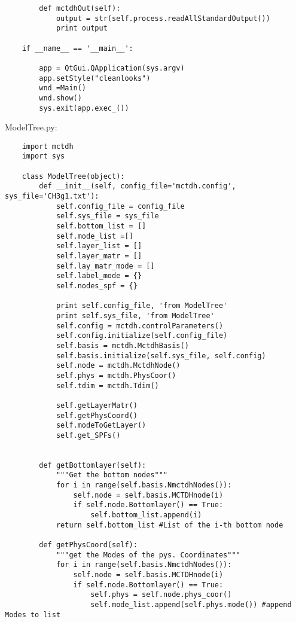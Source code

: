 \begin{verbatim}
        def mctdhOut(self):
            output = str(self.process.readAllStandardOutput())
            print output
    
    if __name__ == '__main__':
    
        app = QtGui.QApplication(sys.argv)
        app.setStyle("cleanlooks")
        wnd =Main()
        wnd.show()
        sys.exit(app.exec_())
\end{verbatim}

ModelTree.py:

\begin{verbatim}
    import mctdh
    import sys
    
    class ModelTree(object):
        def __init__(self, config_file='mctdh.config', sys_file='CH3g1.txt'):
            self.config_file = config_file
            self.sys_file = sys_file
            self.bottom_list = []
            self.mode_list =[]
            self.layer_list = []
            self.layer_matr = []
            self.lay_matr_mode = []
            self.label_mode = {}
            self.nodes_spf = {}
    
            print self.config_file, 'from ModelTree'
            print self.sys_file, 'from ModelTree'
            self.config = mctdh.controlParameters()
            self.config.initialize(self.config_file)
            self.basis = mctdh.MctdhBasis()
            self.basis.initialize(self.sys_file, self.config)
            self.node = mctdh.MctdhNode()
            self.phys = mctdh.PhysCoor()
            self.tdim = mctdh.Tdim()
    
            self.getLayerMatr()
            self.getPhysCoord()
            self.modeToGetLayer()
            self.get_SPFs()
    
    
        def getBottomlayer(self):
            """Get the bottom nodes"""
            for i in range(self.basis.NmctdhNodes()):
                self.node = self.basis.MCTDHnode(i)
                if self.node.Bottomlayer() == True:
                    self.bottom_list.append(i)
            return self.bottom_list #List of the i-th bottom node
    
        def getPhysCoord(self):
            """get the Modes of the pys. Coordinates"""
            for i in range(self.basis.NmctdhNodes()):
                self.node = self.basis.MCTDHnode(i)
                if self.node.Bottomlayer() == True:
                    self.phys = self.node.phys_coor()
                    self.mode_list.append(self.phys.mode()) #append Modes to list
    

\end{verbatim}
